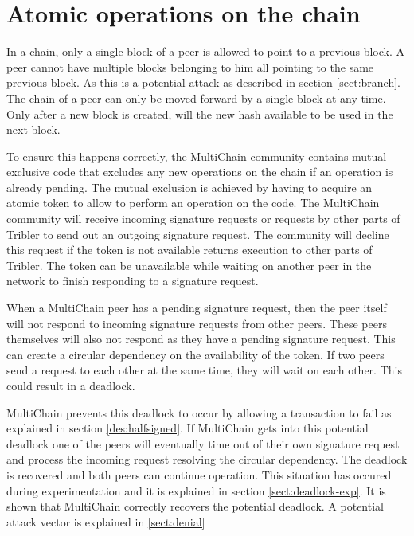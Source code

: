 \section{Atomic operations on the chain}
\label{sect:deadlock}
In a chain, only a single block of a peer is allowed to point to a previous block.
A peer cannot have multiple blocks belonging to him all pointing to the same previous block.
As this is a potential attack as described in section \ref{sect:branch}.
The chain of a peer can only be moved forward by a single block at any time.
Only after a new block is created, will the new hash available to be used in the next block.

To ensure this happens correctly, the MultiChain community contains mutual exclusive code
that excludes any new operations on the chain if an operation is already pending.
The mutual exclusion is achieved by having to acquire an atomic token to allow to perform an operation on the code.
The MultiChain community will receive incoming signature requests
or requests by other parts of Tribler to send out an outgoing signature request.
The community will decline this request if the token is not available
returns execution to other parts of Tribler.
The token can be unavailable while waiting on another peer in the network to finish responding to a signature request.

When a MultiChain peer has a pending signature request,
then the peer itself will not respond to incoming signature requests from other peers.
These peers themselves will also not respond as they have a pending signature request.
This can create a circular dependency on the availability of the token.
If two peers send a request to each other at the same time, they will wait on each other.
This could result in a deadlock.

MultiChain prevents this deadlock to occur by allowing a transaction to fail
as explained in section \ref{des:halfsigned}.
If MultiChain gets into this potential deadlock one of the peers will eventually time out of their own signature request
and process the incoming request resolving the circular dependency.
The deadlock is recovered and both peers can continue operation.
This situation has occured during experimentation and it is explained in section \ref{sect:deadlock-exp}.
It is shown that MultiChain correctly recovers the potential deadlock.
A potential attack vector is explained in \ref{sect:denial}


